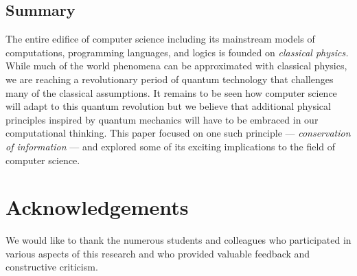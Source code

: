 \documentclass{article}
\begin{document}
\subsection{Summary}

The entire edifice of computer science including its mainstream models
of computations, programming languages, and logics is founded on
\emph{classical physics.} While much of the world phenomena can be
approximated with classical physics, we are reaching a revolutionary
period of quantum technology that challenges many of the classical
assumptions. It remains to be seen how computer science will adapt to
this quantum revolution but we believe that additional physical
principles inspired by quantum mechanics will have to be embraced in
our computational thinking. This paper focused on one such principle
--- \emph{conservation of information} --- and explored some of its
exciting implications to the field of computer science.

\section*{Acknowledgements} We would like to thank the numerous
students and colleagues who participated in various aspects of this
research and who provided valuable feedback and constructive criticism.



\end{document}
